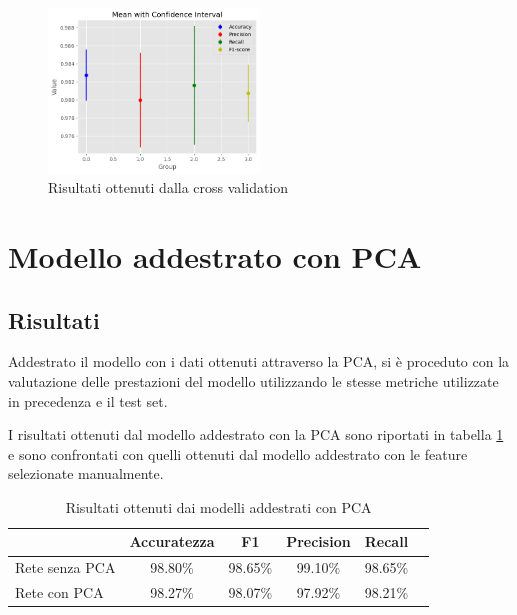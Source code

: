 \begin{figure}[!ht]
    \centering
    \includegraphics[width=0.5\textwidth]{img/rete/intervalli_confidenza.png}
    \caption{Risultati ottenuti dalla cross validation}
    \label{fig:risultatiCrossValidation}
\end{figure}
\section{Modello addestrato con PCA}
\subsection{Risultati}
Addestrato il modello con i dati ottenuti attraverso la PCA, si è proceduto con
la valutazione delle prestazioni del modello utilizzando le stesse metriche
utilizzate in precedenza e il test set.

I risultati ottenuti dal modello addestrato con la PCA sono riportati in tabella
\ref{tab:risultatiReteNeuralePCA} e sono confrontati con quelli ottenuti dal
modello addestrato con le feature selezionate manualmente.

\begin{table}[ht]
    \centering
    \begin{tabular}{@{}lccccc@{}}
        \toprule
        \rowcolor[HTML]{EFEFEF}
        \multicolumn{1}{c}{\cellcolor[HTML]{EFEFEF}\textbf{Modello}} & \textbf{Accuratezza} & \textbf{F1} & \textbf{Precision} & \textbf{Recall} \\ \midrule
        Rete senza PCA                                               & 98.80\%              & 98.65\%     & 99.10\%            & 98.65\%         \\
        Rete con PCA                                                 & 98.27\%              & 98.07\%     & 97.92\%            & 98.21\%         \\ \bottomrule
    \end{tabular}
    \caption{Risultati ottenuti dai modelli addestrati con PCA}
    \label{tab:risultatiReteNeuralePCA}
\end{table}

